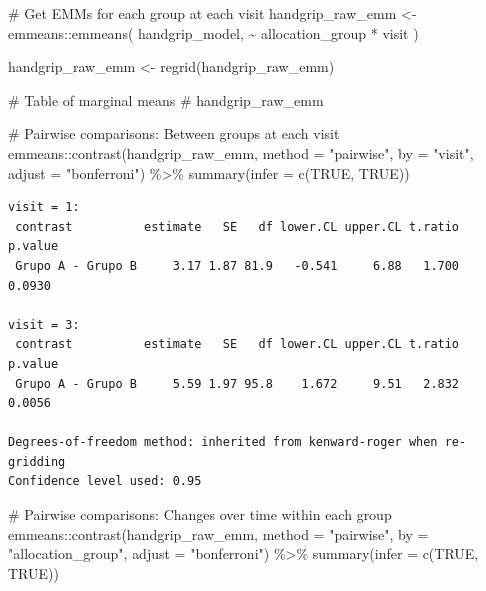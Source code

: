 \documentclass[
  12pt,
]{article}
\newenvironment{Shaded}{\begin{snugshade}}{\end{snugshade}}
\newcommand{\AttributeTok}[1]{\textcolor[rgb]{0.40,0.45,0.13}{#1}}
\newcommand{\CommentTok}[1]{\textcolor[rgb]{0.37,0.37,0.37}{#1}}
\newcommand{\ConstantTok}[1]{\textcolor[rgb]{0.56,0.35,0.01}{#1}}
\newcommand{\FunctionTok}[1]{\textcolor[rgb]{0.28,0.35,0.67}{#1}}
\newcommand{\NormalTok}[1]{\textcolor[rgb]{0.00,0.23,0.31}{#1}}
\newcommand{\OtherTok}[1]{\textcolor[rgb]{0.00,0.23,0.31}{#1}}
\newcommand{\SpecialCharTok}[1]{\textcolor[rgb]{0.37,0.37,0.37}{#1}}
\newcommand{\StringTok}[1]{\textcolor[rgb]{0.13,0.47,0.30}{#1}}
\begin{document}
\begin{Shaded}
\begin{Highlighting}[]
\CommentTok{\# Get EMMs for each group at each visit}
\NormalTok{handgrip\_raw\_emm }\OtherTok{\textless{}{-}}\NormalTok{ emmeans}\SpecialCharTok{::}\FunctionTok{emmeans}\NormalTok{(}
\NormalTok{    handgrip\_model, }
    \SpecialCharTok{\textasciitilde{}}\NormalTok{ allocation\_group }\SpecialCharTok{*}\NormalTok{ visit}
\NormalTok{)}

\NormalTok{handgrip\_raw\_emm }\OtherTok{\textless{}{-}} \FunctionTok{regrid}\NormalTok{(handgrip\_raw\_emm)}

\CommentTok{\# Table of marginal means}
\CommentTok{\# handgrip\_raw\_emm}

\CommentTok{\# Pairwise comparisons: Between groups at each visit}
\NormalTok{emmeans}\SpecialCharTok{::}\FunctionTok{contrast}\NormalTok{(handgrip\_raw\_emm,}
\AttributeTok{method =} \StringTok{"pairwise"}\NormalTok{, }\AttributeTok{by =} \StringTok{"visit"}\NormalTok{,}
\AttributeTok{adjust =} \StringTok{"bonferroni"}\NormalTok{) }\SpecialCharTok{\%\textgreater{}\%} \FunctionTok{summary}\NormalTok{(}\AttributeTok{infer =} \FunctionTok{c}\NormalTok{(}\ConstantTok{TRUE}\NormalTok{, }\ConstantTok{TRUE}\NormalTok{))}
\end{Highlighting}
\end{Shaded}

\begin{verbatim}
visit = 1:
 contrast          estimate   SE   df lower.CL upper.CL t.ratio p.value
 Grupo A - Grupo B     3.17 1.87 81.9   -0.541     6.88   1.700  0.0930

visit = 3:
 contrast          estimate   SE   df lower.CL upper.CL t.ratio p.value
 Grupo A - Grupo B     5.59 1.97 95.8    1.672     9.51   2.832  0.0056

Degrees-of-freedom method: inherited from kenward-roger when re-gridding 
Confidence level used: 0.95 
\end{verbatim}

\begin{Shaded}
\begin{Highlighting}[]
\CommentTok{\# Pairwise comparisons: Changes over time within each group}
\NormalTok{emmeans}\SpecialCharTok{::}\FunctionTok{contrast}\NormalTok{(handgrip\_raw\_emm,}
\AttributeTok{method =} \StringTok{"pairwise"}\NormalTok{, }\AttributeTok{by =} \StringTok{"allocation\_group"}\NormalTok{,}
\AttributeTok{adjust =} \StringTok{"bonferroni"}\NormalTok{) }\SpecialCharTok{\%\textgreater{}\%} \FunctionTok{summary}\NormalTok{(}\AttributeTok{infer =} \FunctionTok{c}\NormalTok{(}\ConstantTok{TRUE}\NormalTok{, }\ConstantTok{TRUE}\NormalTok{))}
\end{Highlighting}
\end{Shaded}
\end{document}
